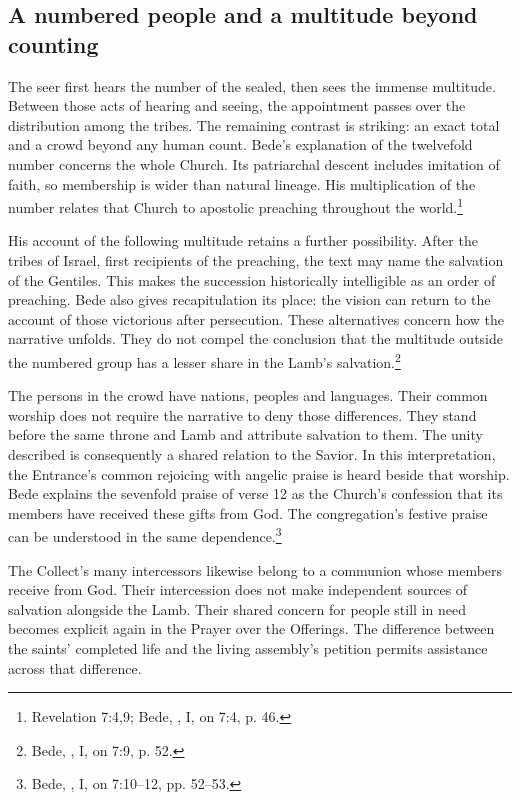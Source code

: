 \subsection{A numbered people and a multitude beyond counting}
The seer first hears the number of the sealed, then sees the immense multitude. Between those acts of hearing and seeing, the appointment passes over the distribution among the tribes. The remaining contrast is striking: an exact total and a crowd beyond any human count. Bede's explanation of the twelvefold number concerns the whole Church. Its patriarchal descent includes imitation of faith, so membership is wider than natural lineage. His multiplication of the number relates that Church to apostolic preaching throughout the world.\footnote{Revelation 7:4,9; Bede, , I, on 7:4, p. 46.}

His account of the following multitude retains a further possibility. After the tribes of Israel, first recipients of the preaching, the text may name the salvation of the Gentiles. This makes the succession historically intelligible as an order of preaching. Bede also gives recapitulation its place: the vision can return to the account of those victorious after persecution. These alternatives concern how the narrative unfolds. They do not compel the conclusion that the multitude outside the numbered group has a lesser share in the Lamb's salvation.\footnote{Bede, , I, on 7:9, p. 52.}

The persons in the crowd have nations, peoples and languages. Their common worship does not require the narrative to deny those differences. They stand before the same throne and Lamb and attribute salvation to them. The unity described is consequently a shared relation to the Savior. In this interpretation, the Entrance's common rejoicing with angelic praise is heard beside that worship. Bede explains the sevenfold praise of verse 12 as the Church's confession that its members have received these gifts from God. The congregation's festive praise can be understood in the same dependence.\footnote{Bede, , I, on 7:10--12, pp. 52--53.}

The Collect's many intercessors likewise belong to a communion whose members receive from God. Their intercession does not make independent sources of salvation alongside the Lamb. Their shared concern for people still in need becomes explicit again in the Prayer over the Offerings. The difference between the saints' completed life and the living assembly's petition permits assistance across that difference.

